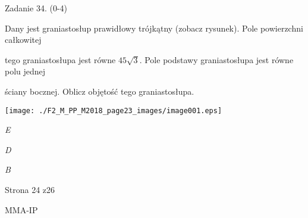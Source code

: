 \documentclass[a4paper,12pt]{article}
\begin{document}
Zadanie 34. (0-4)

Dany jest graniastosłup prawidłowy trójkątny (zobacz rysunek). Pole powierzchni całkowitej

tego graniastosłupa jest równe $45\sqrt{3}$. Pole podstawy graniastosłupa jest równe polu jednej

ściany bocznej. Oblicz objętość tego graniastosłupa.
\begin{center}
\texttt{[image: ./F2\_M\_PP\_M2018\_page23\_images/image001.eps]}
\end{center}
{\it E}

{\it D}

{\it B}

Strona 24 z26

MMA-IP
\end{document}
